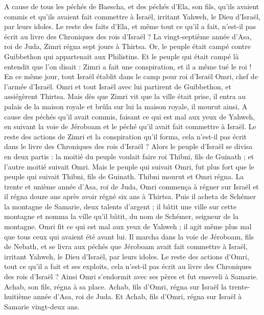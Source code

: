 \begin{multicols}{2}
A cause de tous les péchés de Baescha, et des péchés d'Ela, son fils, qu’ils avaient commis et qu’ils avaient fait commettre à Israël, irritant Yahweh, le Dieu d'Israël, par leurs idoles.
Le reste des faits d'Ela, et même tout ce qu'il a fait, n'est-il pas écrit au livre des Chroniques des rois d'Israël ?
La vingt-septième année d'Asa, roi de Juda, Zimri régna sept jours à Thirtsa. Or, le peuple était campé contre Guibbethon qui appartenait aux Philistins.
Et le peuple qui était campé là entendit que l'on disait : Zimri a fait une conspiration, et il a même tué le roi ! En ce même jour, tout Israël établit dans le camp pour roi d’Israël Omri, chef de l'armée d'Israël.
Omri et tout Israël avec lui partirent de Guibbethon, et assiégèrent Thirtsa.
Mais dès que Zimri vit que la ville était prise, il entra au palais de la maison royale et brûla sur lui la maison royale, il mourut ainsi,
A cause des péchés qu’il avait commis, faisant ce qui est mal aux yeux de Yahweh, en suivant la voie de Jéroboam et le péché qu'il avait fait commettre à Israël.
Le reste des actions de Zimri et la conspiration qu'il forma, cela n’est-il pas écrit dans le livre des Chroniques des rois d'Israël ?
Alors le peuple d'Israël se divisa en deux partis : la moitié du peuple voulait faire roi Thibni, fils de Guinath ; et l'autre moitié suivait Omri.
Mais le peuple qui suivait Omri, fut plus fort que le peuple qui suivait Thibni, fils de Guinath. Thibni mourut et Omri régna.
La trente et unième année d'Asa, roi de Juda, Omri commença à régner sur Israël et il régna douze ans après avoir régné six ans à Thirtsa.
Puis il acheta de Schémer la montagne de Samarie, deux talents d'argent ; il bâtit une ville sur cette montagne et nomma la ville qu'il bâtit, du nom de Schémer, seigneur de la montagne.
Omri fit ce qui est mal aux yeux de Yahweh ; il agit même plus mal que tous ceux qui avaient été avant lui.
Il marcha dans la voie de Jéroboam, fils de Nebath, et se livra aux péchés que Jéroboam avait fait commettre à Israël, irritant Yahweh, le Dieu d'Israël, par leurs idoles.
Le reste des actions d’Omri, tout ce qu'il a fait et ses exploits, cela n’est-il pas écrit au livre des Chroniques des rois d'Israël ?
Ainsi Omri s'endormit avec ses pères et fut enseveli à Samarie. Achab, son fils, régna à sa place.
Achab, fils d’Omri, régna sur Israël la trente-huitième année d'Asa, roi de Juda. Et Achab, fils d’Omri, régna sur Israël à Samarie vingt-deux ans.

\end{multicols}
